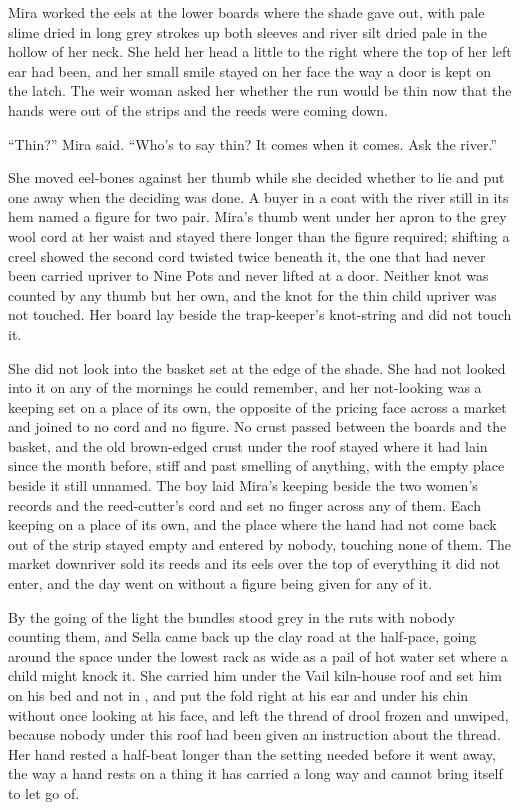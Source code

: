 \scenebreak

Mira worked the eels at the lower boards where the shade gave out, with pale slime dried in long grey strokes up both sleeves and river silt dried pale in the hollow of her neck. She held her head a little to the right where the top of her left ear had been, and her small smile stayed on her face the way a door is kept on the latch. The weir woman asked her whether the run would be thin now that the hands were out of the strips and the reeds were coming down.

“Thin?” Mira said. “Who's to say thin? It comes when it comes. Ask the river.”

She moved eel-bones against her thumb while she decided whether to lie and put one away when the deciding was done. A buyer in a coat with the river still in its hem named a figure for two pair. Mira's thumb went under her apron to the grey wool cord at her waist and stayed there longer than the figure required; shifting a creel showed the second cord twisted twice beneath it, the one that had never been carried upriver to Nine Pots and never lifted at a door. Neither knot was counted by any thumb but her own, and the knot for the thin child upriver was not touched. Her board lay beside the trap-keeper's knot-string and did not touch it.

She did not look into the basket set at the edge of the shade. She had not looked into it on any of the mornings he could remember, and her not-looking was a keeping set on a place of its own, the opposite of the pricing face across a market and joined to no cord and no figure. No crust passed between the boards and the basket, and the old brown-edged crust under the roof stayed where it had lain since the month before, stiff and past smelling of anything, with the empty place beside it still unnamed. The boy laid Mira's keeping beside the two women's records and the reed-cutter's cord and set no finger across any of them. Each keeping on a place of its own, and the place where the hand had not come back out of the strip stayed empty and entered by nobody, touching none of them. The market downriver sold its reeds and its eels over the top of everything it did not enter, and the day went on without a figure being given for any of it.

\scenebreak

By the going of the light the bundles stood grey in the ruts with nobody counting them, and Sella came back up the clay road at the half-pace, going around the space under the lowest rack as wide as a pail of hot water set where a child might knock it. She carried him under the Vail kiln-house roof and set him on his bed and not in , and put the fold right at his ear and under his chin without once looking at his face, and left the thread of drool frozen and unwiped, because nobody under this roof had been given an instruction about the thread. Her hand rested a half-beat longer than the setting needed before it went away, the way a hand rests on a thing it has carried a long way and cannot bring itself to let go of.

